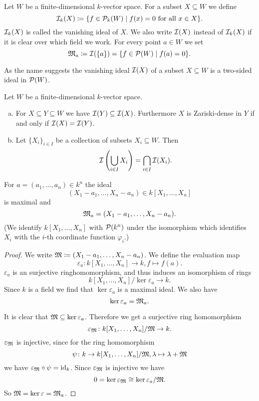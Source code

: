 \begin{defi}
 Let $W$ be a finite-dimensional $k$-vector space. For a subset $X \subseteq W$ we define
 \[
  \mathcal{I}_k(X) \coloneqq \{ f \in \mathcal{P}_k(W) \mid f(x) = 0 \text{ for all } x \in X \}.
 \]
 $\mathcal{I}_k(X)$ is called the vanishing ideal of $X$. We also write $\mathcal{I}(X)$ instead of $\mathcal{I}_k(X)$ if it is clear over which field we work.
 For every point $a \in W$ we set
 \[
  \mathfrak{M}_a \coloneqq \mathcal{I}(\{a\}) = \{f \in \mathcal{P}(W) \mid f(a) = 0\}.
 \]
\end{defi}


\begin{rem}
 As the name suggests the vanishing ideal $\mathcal{I}(X)$ of a subset $X \subseteq W$ is a two-sided ideal in $\mathcal{P}(W)$.
\end{rem}


\begin{rem}
 Let $W$ be a finite-dimensional $k$-vector space.
 \begin{enumerate}[a)]
  \item
  For $X \subseteq Y \subseteq W$ we have $\mathcal{I}(Y) \subseteq \mathcal{I}(X)$. Furthermore $X$ is Zariski-dense in $Y$ if and only if $\mathcal{I}(X) = \mathcal{I}(Y)$.
  \item
  Let $\{X_i\}_{i \in I}$ be a collection of subsets $X_i \subseteq W$. Then
  \[
   \mathcal{I}\left( \bigcup_{i \in I} X_i \right) = \bigcap_{i \in I} \mathcal{I}(X_i).
  \]
 \end{enumerate}
\end{rem}


\begin{lem}
 For $a = (a_1, \dotsc, a_n) \in k^n$ the ideal
 \[
  (X_1 - a_1, \dotsc, X_n - a_n) \in k[X_1, \dotsc, X_n]
 \]
 is maximal and
 \[
  \mathfrak{M}_a = (X_1 - a_1, \dotsc, X_n - a_n).
 \]
 (We identify $k[X_1, \dotsc, X_n]$ with $\mathcal{P}(k^n)$ under the isomorphism which identifies $X_i$ with the $i$-th coordinate function $\varphi_i$.)
\end{lem}
\begin{proof}
 We write $\mathfrak{M} \coloneqq (X_1 - a_1, \dotsc, X_n - a_n)$. We define the evaluation map
 \[
  \varepsilon_a \colon k[X_1, \dotsc, X_n] \to k, f \mapsto f(a).
 \]
 $\varepsilon_a$ is an surjective ringhomomorphism, and thus induces an isomorphism of rings
 \[
  k[X_1, \dotsc, X_n]/\ker \varepsilon_a \to k.
 \]
 Since $k$ is a field we find that $\ker \varepsilon_a$ is a maximal ideal. We also have
 \[
  \ker \varepsilon_a = \mathfrak{M}_a.
 \]
 
 It is clear that $\mathfrak{M} \subseteq \ker \varepsilon_a$. Therefore we get a surjective ring homomorphism
 \[
  \varepsilon_\mathfrak{M} \colon k[X_1, \dotsc, X_n]/\mathfrak{M} \to k.
 \]
 $\varepsilon_\mathfrak{M}$ is injective, since for the ring homomorphism
 \[
  \psi \colon k \to k[X_1, \dotsc, X_n]/\mathfrak{M}, \lambda \mapsto \lambda + \mathfrak{M}
 \]
 we have $\varepsilon_\mathfrak{M} \circ \psi = \operatorname{id}_k$. Since $\varepsilon_\mathfrak{M}$ is injective we have
 \[
  0 = \ker \varepsilon_\mathfrak{M} \cong \ker \varepsilon_a / \mathfrak{M}.
 \]
 So $\mathfrak{M} = \ker \varepsilon = \mathfrak{M}_a$.
\end{proof}

